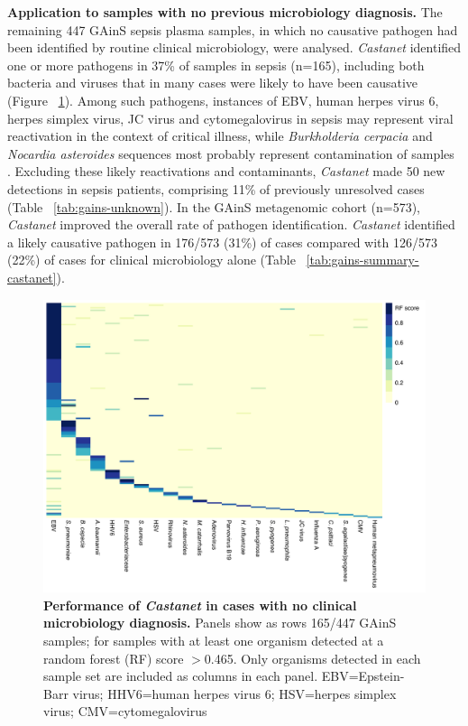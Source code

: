 \textbf{Application to samples with no previous microbiology diagnosis.}
The remaining 447 GAinS sepsis plasma samples, in which no causative pathogen had been identified by routine clinical microbiology, were analysed. \textit{Castanet} identified one or more pathogens in 37\% of samples in sepsis (n=165), including both bacteria and viruses that in many cases were likely to have been causative (Figure ~\ref{fig:rf-unknown}). Among such pathogens, instances of EBV, human herpes virus 6, herpes simplex virus, JC virus and cytomegalovirus in sepsis may represent viral reactivation in the context of critical illness, while \textit{Burkholderia cerpacia} and \textit{Nocardia asteroides} sequences most probably represent contamination of samples \parencite{Salter2014}. Excluding these likely reactivations and contaminants, \textit{Castanet} made 50 new detections in sepsis patients, comprising 11\% of previously unresolved cases (Table ~\ref{tab:gains-unknown}). In the GAinS metagenomic cohort (n=573), \textit{Castanet} improved the overall rate of pathogen identification. \textit{Castanet} identified a likely causative pathogen in 176/573 (31\%) of cases compared with 126/573 (22\%) of cases for clinical microbiology alone (Table ~\ref{tab:gains-summary-castanet}).
 
\begin{figure}[htbp]
\centering
\includegraphics[scale=0.8]{./Results2/Images/rf-gains-unknown.pdf}
\caption[GAinS cases with no clinical microbiology diagnosis]{\textbf{Performance of \textit{Castanet} in cases with no clinical microbiology diagnosis.} Panels show as rows 165/447 GAinS samples; for samples with at least one organism detected at a random forest (RF) score $>$0.465. Only organisms detected in each sample set are included as columns in each panel. EBV=Epstein-Barr virus; HHV6=human herpes virus 6; HSV=herpes simplex virus; CMV=cytomegalovirus}
\label{fig:rf-unknown}
\end{figure}
\FloatBarrier

